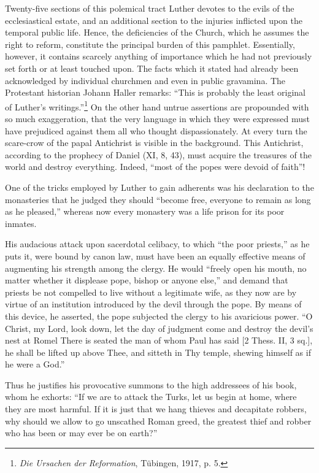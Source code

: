Twenty-five sections of this polemical tract Luther devotes to
the evils of the ecclesiastical estate, and an additional section to the
injuries inflicted upon the temporal public life. Hence, the deficiencies
of the Church, which he assumes the right to reform, constitute the
principal burden of this pamphlet. Essentially, however, it contains
scarcely anything of importance which he had not previously set
forth or at least touched upon. The facts which it stated had already
been acknowledged by individual churchmen and even in public
gravamina. The Protestant historian Johann Haller remarks: “This
is probably the least original of Luther’s writings.”\footnote
{\textit{Die Ursachen der Reformation}, Tübingen, 1917, p. 5.}
On the other
hand untrue assertions are propounded with so much exaggeration,
that the very language in which they were expressed must have prejudiced
against them all who thought dispassionately. At every turn
the scare-crow of the papal Antichrist is visible in the background.
This Antichrist, according to the prophecy of Daniel (XI, 8, 43),
must acquire the treasures of the world and destroy everything. Indeed,
“most of the popes were devoid of faith”!

One of the tricks employed by Luther to gain adherents was his declaration
to the monasteries that he judged they should “become free, everyone
to remain as long as he pleased,” whereas now every monastery was a life
prison for its poor inmates.

His audacious attack upon sacerdotal celibacy, to which “the poor
priests,” as he puts it, were bound by canon law, must have been an equally
effective means of augmenting his strength among the clergy. He would
“freely open his mouth, no matter whether it displease pope, bishop or anyone
else,” and demand that priests be not compelled to live without a legitimate
wife, as they now are by virtue of an institution introduced by the devil
through the pope. By means of this device, he asserted, the pope subjected
the clergy to his avaricious power. “O Christ, my Lord, look down, let the
day of judgment come and destroy the devil’s nest at Romel There is seated
the man of whom Paul has said [2 Thess. II, 3 sq.], he shall be lifted up
above Thee, and sitteth in Thy temple, shewing himself as if he were a
God.”

Thus he justifies his provocative summons to the high addressees of his
book, whom he exhorts: “If we are to attack the Turks, let us begin at
home, where they are most harmful. If it is just that we hang thieves and
decapitate robbers, why should we allow to go unscathed Roman greed,
the greatest thief and robber who has been or may ever be on earth?”

